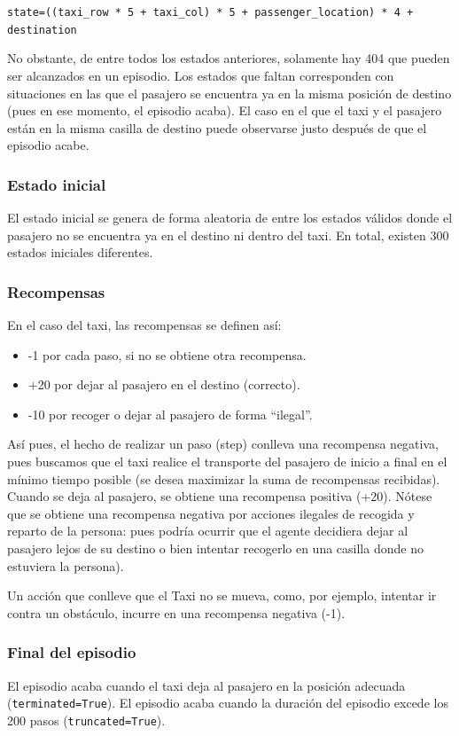 \documentclass{article}
\begin{document}
\texttt{state=((taxi\_row * 5 + taxi\_col) * 5 + passenger\_location) * 4 + destination}

No obstante, de entre todos los estados anteriores, solamente hay 404 que pueden ser alcanzados en un episodio. Los estados que faltan corresponden con situaciones en las que el pasajero se encuentra ya en la misma posición de destino (pues en ese momento, el episodio acaba). El caso en el que el taxi y el pasajero están en la misma casilla de destino puede observarse justo después de que el episodio acabe.

\subsubsection{Estado inicial}
El estado inicial se genera de forma aleatoria de entre los estados válidos donde el pasajero no se encuentra ya en el destino ni dentro del taxi. En total, existen 300 estados iniciales diferentes.

\subsubsection{Recompensas}
En el caso del taxi, las recompensas se definen así:
\begin{itemize}
    \item -1 por cada paso, si no se obtiene otra recompensa.
    \item +20 por dejar al pasajero en el destino (correcto).
    \item -10 por recoger o dejar al pasajero de forma ``ilegal''.
\end{itemize}

Así pues, el hecho de realizar un paso (step) conlleva una recompensa negativa, pues buscamos que el taxi realice el transporte del pasajero de inicio a final en el mínimo tiempo posible (se desea maximizar la suma de recompensas recibidas). Cuando se deja al pasajero, se obtiene una recompensa positiva (+20). Nótese que se obtiene una recompensa negativa por acciones ilegales de recogida y reparto de la persona: pues podría ocurrir que el agente decidiera dejar al pasajero lejos de su destino o bien intentar recogerlo en una casilla donde no estuviera la persona).

Un acción que conlleve que el Taxi no se mueva, como, por ejemplo, intentar ir contra un obstáculo, incurre en una recompensa negativa (-1). 

\subsubsection{Final del episodio}
El episodio acaba cuando el taxi deja al pasajero en la posición adecuada (\texttt{terminated=True}). El episodio acaba cuando la duración del episodio excede los 200 pasos (\texttt{truncated=True}).
\end{document}
